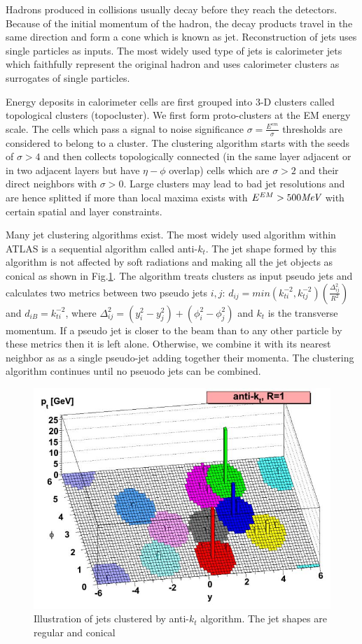 \label{sec:reco-jets}
Hadrons produced in collisions usually decay before they reach the detectors. Because of the initial momentum of the hadron, the decay products travel in the same direction and form a cone which is known as jet. Reconstruction of jets uses single particles as inputs. The most widely used type of jets is calorimeter jets which faithfully represent the original hadron and uses calorimeter clusters as surrogates of single particles.

Energy deposits in calorimeter cells are first grouped into 3-D clusters called topological clusters (topocluster)\cite{PERF-2014-07}. We first form proto-clusters at the EM energy scale. The cells which pass a signal to noise significance $\sigma=\frac{E^{em}}{\sigma}$ thresholds are considered to belong to a cluster. The clustering algorithm starts with the seeds of $\sigma>4$ and then collects topologically connected (in the same layer adjacent or in two adjacent layers but have $\eta- \phi$ overlap) cells which are $\sigma>2$ and their direct neighbors with $\sigma>0$. Large clusters may lead to bad jet resolutions and are hence splitted if more than local maxima exists with $E^{EM}>500 \textit{MeV}$ with certain spatial and layer constraints.

Many jet clustering algorithms exist. The most widely used algorithm within ATLAS is a sequential algorithm called anti-$k_t$\cite{Cacciari:2008gp}. The jet shape formed by this algorithm is not affected by soft radiations and making all the jet objects as conical as shown in Fig.\ref{fig:reco-antikt}. The algorithm treats clusters as input pseudo jets and calculates two metrics between two pseudo jets $i,j$: $d_{ij}=min(k^{-2}_{ti},k^{-2}_{tj})(\frac{\Delta^2_{ij}}{R^2})$ and $d_{iB}=k^{-2}_{ti}$, where $\Delta^2_{ij}=(y_i^2-y_j^2)+(\phi_i^2-\phi_j^2)$ and $k_t$ is the transverse momentum. If a pseudo jet is closer to the beam than to any other particle by these metrics then it is left alone. Otherwise, we combine it with its nearest neighbor as as a single pseudo-jet adding together their momenta. The clustering algorithm continues until no pseuodo jets can be combined.

\begin{figure}[htpb!]
\begin{center}
  \includegraphics[width=0.55\linewidth]{figures/Reco/Antikt}
\caption{Illustration of jets clustered by anti-$k_t$ algorithm. The jet shapes are regular and conical}
\label{fig:reco-antikt}
\end{center}
\end{figure}

